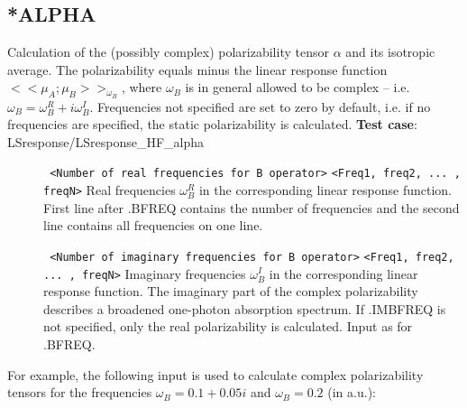 \subsection{*ALPHA}\label{subsec:alpha}
Calculation of the (possibly complex) 
polarizability tensor $\alpha$ and its isotropic average.
The polarizability equals minus the linear response function
$<< \mu_A; \mu_B >>_{\omega_B}$, where
$\omega_B$ is in general allowed to be complex --
i.e. $\omega_B = \omega_B^R + i \omega_B^I$.
Frequencies not specified are set to zero by default,
i.e. if no frequencies are specified, the static polarizability is calculated.
\newline
{\bf Test case}: LSresponse/LSresponse\_HF\_alpha 
\begin{description}
\item[] \verb| | \newline
\verb|<Number of real frequencies for B operator>|\newline
\verb|<Freq1, freq2, ... , freqN>|\newline
Real frequencies $\omega_B^R$ in the corresponding linear response function.
First line after .BFREQ contains the number of frequencies
and the second line contains all frequencies on one line.
\item[] \verb| | \newline
\verb|<Number of imaginary frequencies for B operator>|\newline
\verb|<Freq1, freq2, ... , freqN>|\newline
Imaginary frequencies $\omega_B^I$ in the corresponding
linear response function.
The imaginary part of the complex polarizability describes a broadened one-photon
absorption spectrum.
If .IMBFREQ is not specified, only the real polarizability is calculated.
Input as for .BFREQ. 
\end{description}
For example, the following input is used 
to calculate complex polarizability tensors
for the frequencies $\omega_B = 0.1 + 0.05i$ and $\omega_B = 0.2$ 
(in a.u.):
\begin{description}
\item[]
\item[]
\item[]
\item[]
\item[]
\item[]
\item[]
\item[]
\end{description}


